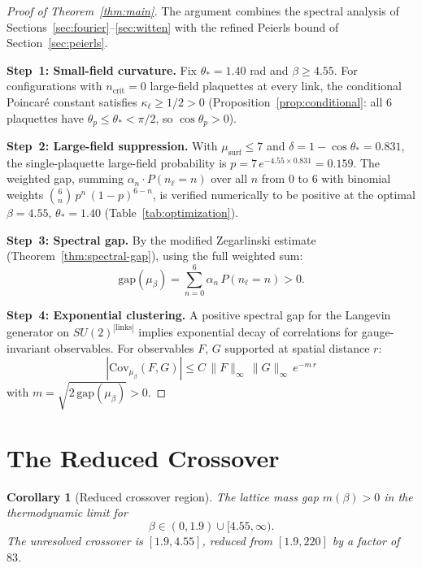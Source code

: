\documentclass[11pt,a4paper]{article}
\theoremstyle{plain}
\newtheorem{corollary}[theorem]{Corollary}
\theoremstyle{definition}
\theoremstyle{remark}
\newcommand{\Cov}{\mathrm{Cov}}
\begin{document}
\begin{proof}[Proof of Theorem~\ref{thm:main}]
The argument combines the spectral analysis of
Sections~\ref{sec:fourier}--\ref{sec:witten} with the refined
Peierls bound of Section~\ref{sec:peierls}.

\textbf{Step~1: Small-field curvature.}
Fix $\theta_* = 1.40$ rad and $\beta \geq 4.55$.
For configurations with $n_{\mathrm{crit}} = 0$
large-field plaquettes at every link, the conditional Poincar\'e
constant satisfies $\kappa_\ell \geq 1/2 > 0$
(Proposition~\ref{prop:conditional}: all $6$ plaquettes have
$\theta_p \leq \theta_* < \pi/2$, so $\cos\theta_p > 0$).

\textbf{Step~2: Large-field suppression.}
With $\mu_{\mathrm{surf}} \leq 7$ and
$\delta = 1 - \cos\theta_* = 0.831$,
the single-plaquette large-field probability is
$p = 7\,e^{-4.55 \times 0.831} = 0.159$.
The weighted gap, summing $\alpha_n \cdot P(n_\ell = n)$
over all $n$ from $0$ to $6$ with binomial weights
$\binom{6}{n}\,p^n\,(1-p)^{6-n}$, is verified
numerically to be positive at the optimal
$\beta = 4.55$, $\theta_* = 1.40$ (Table~\ref{tab:optimization}).

\textbf{Step~3: Spectral gap.}
By the modified Zegarlinski estimate
(Theorem~\ref{thm:spectral-gap}), using the full weighted sum:
\[
  \mathrm{gap}(\mu_\beta)
  = \sum_{n=0}^{6} \alpha_n\,P(n_\ell = n)
  > 0.
\]

\textbf{Step~4: Exponential clustering.}
A positive spectral gap for the Langevin generator on
$SU(2)^{|\mathrm{links}|}$ implies exponential decay of
correlations for gauge-invariant observables.
For observables $F$, $G$ supported at spatial distance $r$:
\[
  |\Cov_{\mu_\beta}(F, G)|
  \leq C\,\|F\|_\infty\,\|G\|_\infty\,e^{-m\,r}
\]
with $m = \sqrt{2\,\mathrm{gap}(\mu_\beta)} > 0$.
\end{proof}


\section{The Reduced Crossover}\label{sec:crossover}

\begin{corollary}[Reduced crossover region]
\label{cor:crossover}
The lattice mass gap $m(\beta) > 0$ in the thermodynamic limit for
\[
  \beta \in (0, 1.9) \cup [4.55, \infty).
\]
The unresolved crossover is $[1.9, 4.55]$, reduced from $[1.9, 220]$
by a factor of~$83$.
\end{corollary}
\end{document}

